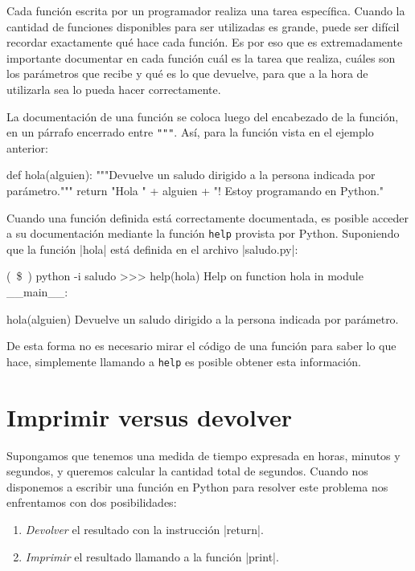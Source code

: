 Cada función escrita por un programador realiza una tarea específica.  Cuando
la cantidad de funciones disponibles para ser utilizadas es grande, puede ser
difícil recordar exactamente qué hace cada función.  Es por eso que es
extremadamente importante documentar en cada función cuál es la tarea que
realiza, cuáles son los parámetros que recibe y qué es lo que devuelve, para
que a la hora de utilizarla sea lo pueda hacer correctamente.

La documentación de una función se coloca luego del encabezado de la función,
en un párrafo encerrado entre \lstinline!"""!.  Así, para la función vista en
el ejemplo anterior:

\begin{codigo-python-sn}
def hola(alguien):
    """Devuelve un saludo dirigido a la persona indicada por parámetro."""
    return "Hola " + alguien + "! Estoy programando en Python."
\end{codigo-python-sn}

\begin{sabias_que}
Cuando una función definida está correctamente documentada, es posible acceder
a su documentación mediante la función \lstinline!help! provista por Python.
Suponiendo que la función |hola| está definida en el archivo |saludo.py|:

\begin{codigo-python-sn}
(~\$~) python -i saludo
>>> help(hola)
Help on function hola in module __main__:

hola(alguien)
    Devuelve un saludo dirigido a la persona indicada por parámetro.
\end{codigo-python-sn}

De esta forma no es necesario mirar el código de una función para saber lo que
hace, simplemente llamando a \lstinline!help! es posible obtener esta
información.
\end{sabias_que}

\section{Imprimir versus devolver}

Supongamos que tenemos una medida de tiempo expresada en horas, minutos y
segundos, y queremos calcular la cantidad total de segundos. Cuando nos
disponemos a escribir una función en Python para resolver este problema nos
enfrentamos con dos posibilidades:

\begin{enumerate}
\item \emph{Devolver} el resultado con la instrucción |return|.
\item \emph{Imprimir} el resultado llamando a la función |print|.
\end{enumerate}

